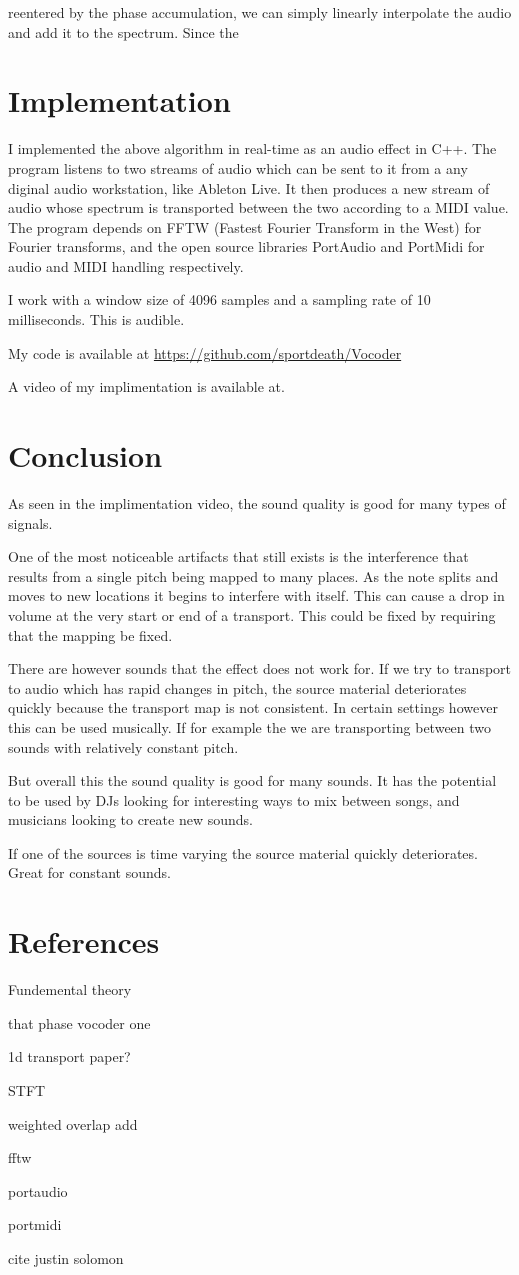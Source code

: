 \documentclass[12pt]{article}
\begin{document}
reentered by the phase accumulation, 
we can simply linearly interpolate the audio and add it to the spectrum.
Since the 

\section{Implementation}

I implemented the above algorithm in real-time as an audio effect in C++.
The program listens to two streams of audio
which can be sent to it from a any diginal audio workstation, like Ableton Live.
It then produces a new stream of audio 
whose spectrum is transported between the two
according to a MIDI value.
The program depends on FFTW (Fastest Fourier Transform in the West) for Fourier transforms, and the open source libraries PortAudio and PortMidi for audio and MIDI handling respectively.

I work with a window size of 4096 samples and a sampling rate of 10 milliseconds. This is audible. 

My code is available at
\url{https://github.com/sportdeath/Vocoder}

A video of my implimentation is available at.

\section{Conclusion}

As seen in the implimentation video, the sound quality is good for many types of signals.

One of the most noticeable artifacts that still exists is the interference that results from a single pitch being mapped to many places.
As the note splits and moves to new locations it begins to interfere with itself.
This can cause a drop in volume at the very start or end of a transport.
This could be fixed by requiring that the mapping be fixed.

There are however sounds that the effect does not work for.
If we try to transport to audio which has rapid changes in pitch, the source material deteriorates quickly because the transport map is not consistent.
In certain settings however this can be used musically.
If for example the we are transporting between two sounds with relatively constant pitch.

But overall this the sound quality is good for many sounds.
It has the potential to be used by DJs looking for interesting ways to mix between songs, and musicians looking to create new sounds.

If one of the sources is time varying the source material quickly deteriorates.
Great for constant sounds.

\section{References}

Fundemental theory

that phase vocoder one

1d transport paper?

STFT

weighted overlap add

fftw

portaudio

portmidi

cite justin solomon
\end{document}
